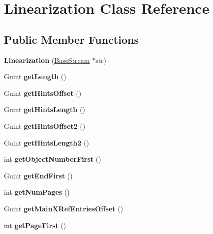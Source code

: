 \hypertarget{class_linearization}{}\section{Linearization Class Reference}
\label{class_linearization}
\subsection*{Public Member Functions}
\begin{DoxyCompactItemize}
\item 
\mbox{\label{class_linearization_ad0ac04ff45aac38d6575ec6f3b34abd2}} 
{\bfseries Linearization} (\hyperlink{class_base_stream}{Base\+Stream} $\ast$str)
\item 
\mbox{\label{class_linearization_a4937950da50ce40e79fff01314c44599}} 
Guint {\bfseries get\+Length} ()
\item 
\mbox{\label{class_linearization_ac79c1b3101957770114bf5e6e389a359}} 
Guint {\bfseries get\+Hints\+Offset} ()
\item 
\mbox{\label{class_linearization_a906ee582a885ad01320c41e57c959be5}} 
Guint {\bfseries get\+Hints\+Length} ()
\item 
\mbox{\label{class_linearization_a9accb8e690f4b73a9f873afc4b257a39}} 
Guint {\bfseries get\+Hints\+Offset2} ()
\item 
\mbox{\label{class_linearization_a72b28bcf9a171c24e1cefb465c57a1a3}} 
Guint {\bfseries get\+Hints\+Length2} ()
\item 
\mbox{\label{class_linearization_ae2493a3d2eb3736cba0be72a57cf4806}} 
int {\bfseries get\+Object\+Number\+First} ()
\item 
\mbox{\label{class_linearization_a472498a48df6738c88f5a38d1b273c93}} 
Guint {\bfseries get\+End\+First} ()
\item 
\mbox{\label{class_linearization_abab989548e44e6d577d3159fa932e5f7}} 
int {\bfseries get\+Num\+Pages} ()
\item 
\mbox{\label{class_linearization_aa44302e67b8a4caee028b181456934ee}} 
Guint {\bfseries get\+Main\+X\+Ref\+Entries\+Offset} ()
\item 
\mbox{\label{class_linearization_a788ae8401498ac832f7a932631b44e18}} 
int {\bfseries get\+Page\+First} ()
\end{DoxyCompactItemize}


